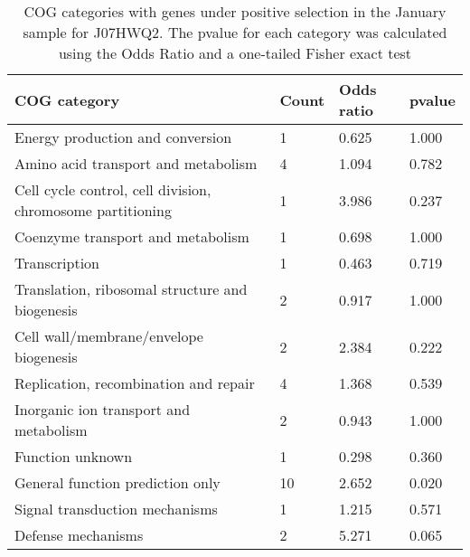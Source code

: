\begin{table}[]
\footnotesize 
	\tabcolsep=0.11cm 
\caption{COG categories with genes under positive selection in the January sample for J07HWQ2. The pvalue for each category was calculated using the Odds Ratio and a one-tailed Fisher exact test} 
\begin{tabularx}{\textwidth}{L{6cm}R{2cm}R{2cm}R{2cm}} 
\hline 
\textbf{COG category} & \textbf{Count} & \textbf{Odds ratio} & \textbf{pvalue} \\ 
\hline 
Energy production and conversion & 1 & 0.625 & 1.000 \\ 
Amino acid transport and metabolism & 4 & 1.094 & 0.782 \\ 
Cell cycle control, cell division, chromosome partitioning & 1 & 3.986 & 0.237 \\ 
Coenzyme transport and metabolism & 1 & 0.698 & 1.000 \\ 
Transcription & 1 & 0.463 & 0.719 \\ 
Translation, ribosomal structure and biogenesis & 2 & 0.917 & 1.000 \\ 
Cell wall/membrane/envelope biogenesis & 2 & 2.384 & 0.222 \\ 
Replication, recombination and repair & 4 & 1.368 & 0.539 \\ 
Inorganic ion transport and metabolism & 2 & 0.943 & 1.000 \\ 
Function unknown & 1 & 0.298 & 0.360 \\ 
General function prediction only & 10 & 2.652 & 0.020 \\ 
Signal transduction mechanisms & 1 & 1.215 & 0.571 \\ 
Defense mechanisms & 2 & 5.271 & 0.065 \\ 
\end{tabularx} 
\label{January_COG_Selection_J07HWQ2} 
 \end{table} 

